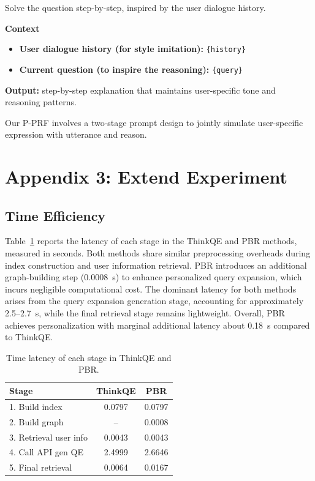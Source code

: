\begin{tcolorbox}[colback=blue!5!white, colframe=blue!75!black, title=P-PRF-logically]
Solve the question step-by-step, inspired by the user dialogue history.

\textbf{Context}
\begin{itemize}
    \item \textbf{User dialogue history (for style imitation):} \texttt{\{history\}}
    \item \textbf{Current question (to inspire the reasoning):} \texttt{\{query\}}
\end{itemize}

\textbf{Output:} step-by-step explanation that maintains user-specific tone and reasoning patterns.
\end{tcolorbox}

Our P-PRF involves a two-stage prompt design to jointly simulate user-specific expression  with utterance and reason. 

\section*{Appendix 3: Extend Experiment}

\subsection*{Time Efficiency}

Table~\ref{tab:time_cost} reports the latency of each stage in the ThinkQE and PBR methods, measured in seconds. Both methods share similar preprocessing overheads during index construction and user information retrieval. PBR introduces an additional graph-building step (0.0008~s) to enhance personalized query expansion, which incurs negligible computational cost. The dominant latency for both methods arises from the query expansion generation stage, accounting for approximately 2.5--2.7~s, while the final retrieval stage remains lightweight. Overall, PBR achieves personalization with marginal additional latency about 0.18~s compared to ThinkQE.

\begin{table}[h]
\centering

\begin{tabular}{lcc}
\toprule
\textbf{Stage} & \textbf{ThinkQE} & \textbf{PBR} \\
\midrule
1. Build index & 0.0797 & 0.0797 \\
2. Build graph & -- & 0.0008 \\
3. Retrieval user info & 0.0043 & 0.0043 \\
4. Call API gen QE & 2.4999 & 2.6646 \\
5. Final retrieval & 0.0064 & 0.0167 \\
\bottomrule
\end{tabular}
\caption{Time latency of each stage in ThinkQE and PBR.}
\label{tab:time_cost}
\end{table}

